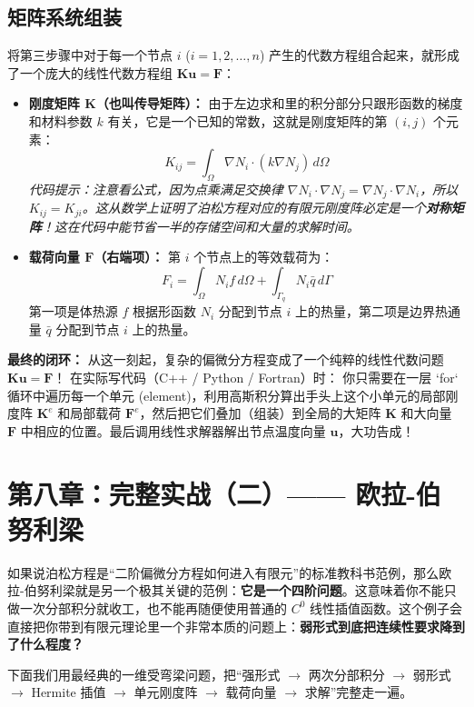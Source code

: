 \documentclass[11pt, a4paper, UTF8]{ctexart}
\begin{document}
\subsection{矩阵系统组装}
将第三步骤中对于每一个节点 $i$ ($i = 1, 2, \dots, n$) 产生的代数方程组合起来，就形成了一个庞大的线性代数方程组 $\bm{K}\bm{u} = \bm{F}$：

\begin{itemize}
    \item \textbf{刚度矩阵 $\bm{K}$（也叫传导矩阵）：}
    由于左边求和里的积分部分只跟形函数的梯度和材料参数 $k$ 有关，它是一个已知的常数，这就是刚度矩阵的第 $(i, j)$ 个元素：
    \[ K_{ij} = \int_{\Omega} \nabla N_i \cdot (k \nabla N_j) \, d\Omega \]
    \textit{代码提示：注意看公式，因为点乘满足交换律 $\nabla N_i \cdot \nabla N_j = \nabla N_j \cdot \nabla N_i$，所以 $K_{ij} = K_{ji}$。这从数学上证明了泊松方程对应的有限元刚度阵必定是一个\textbf{对称矩阵}！这在代码中能节省一半的存储空间和大量的求解时间。}
    
    \item \textbf{载荷向量 $\bm{F}$（右端项）：}
    第 $i$ 个节点上的等效载荷为：
    \[ F_i = \int_{\Omega} N_i f \, d\Omega + \int_{\Gamma_q} N_i \bar{q} \, d\Gamma \]
    第一项是体热源 $f$ 根据形函数 $N_i$ 分配到节点 $i$ 上的热量，第二项是边界热通量 $\bar{q}$ 分配到节点 $i$ 上的热量。
\end{itemize}

\textbf{最终的闭环：} 
从这一刻起，复杂的偏微分方程变成了一个纯粹的线性代数问题 $\bm{K}\bm{u} = \bm{F}$！
在实际写代码（C++ / Python / Fortran）时：
你只需要在一层 `for` 循环中遍历每一个单元 (element)，利用高斯积分算出手头上这个小单元的局部刚度阵 $\bm{K}^e$ 和局部载荷 $\bm{F}^e$，然后把它们叠加（组装）到全局的大矩阵 $\bm{K}$ 和大向量 $\bm{F}$ 中相应的位置。最后调用线性求解器解出节点温度向量 $\bm{u}$，大功告成！

\section{第八章：完整实战（二）—— 欧拉-伯努利梁}
如果说泊松方程是“二阶偏微分方程如何进入有限元”的标准教科书范例，那么欧拉-伯努利梁就是另一个极其关键的范例：\textbf{它是一个四阶问题}。这意味着你不能只做一次分部积分就收工，也不能再随便使用普通的 $C^0$ 线性插值函数。这个例子会直接把你带到有限元理论里一个非常本质的问题上：\textbf{弱形式到底把连续性要求降到了什么程度？}

下面我们用最经典的一维受弯梁问题，把“强形式 $\rightarrow$ 两次分部积分 $\rightarrow$ 弱形式 $\rightarrow$ Hermite 插值 $\rightarrow$ 单元刚度阵 $\rightarrow$ 载荷向量 $\rightarrow$ 求解”完整走一遍。
\end{document}
